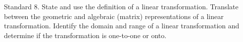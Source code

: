 Standard 8.	State and use the definition of a linear transformation. Translate between the geometric and algebraic (matrix) representations of a linear transformation. Identify the domain and range of a linear transformation and determine if the transformation is one-to-one or onto.


\ifprintanswers
\else %
 \newpage
\fi

\begin{solution}
   
\end{solution}